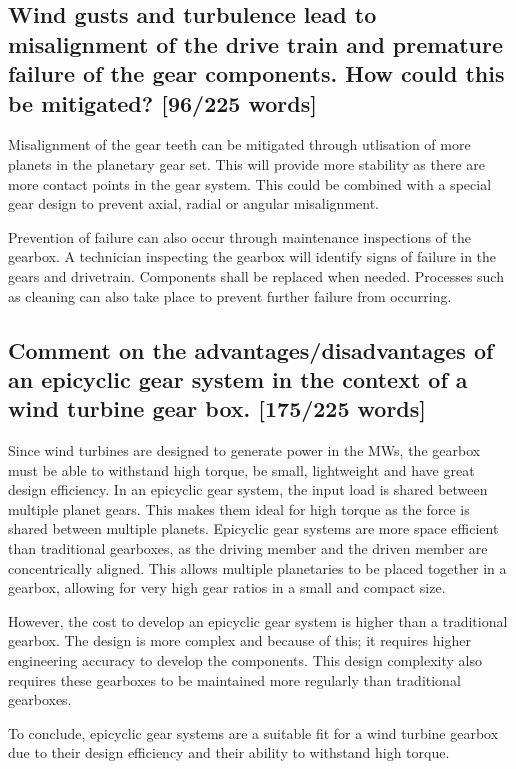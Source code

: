 \documentclass[12pt]{article}
\numberwithin{equation}{section}
\begin{document}
\begin{flushleft}
\subsection[Misalignment and failure prevention.]{Wind gusts and turbulence lead to misalignment of the drive train and premature failure of the gear components. How could this be mitigated? [96/225 words]}
Misalignment of the gear teeth can be mitigated through utlisation of more planets in the planetary gear set. This will provide more stability as there are more contact points in the gear system. This could be combined with a special gear design to prevent axial, radial or angular misalignment. 

Prevention of failure can also occur through maintenance inspections of the gearbox. A technician inspecting the gearbox will identify signs of failure in the gears and drivetrain. Components shall be replaced when needed. Processes such as cleaning can also take place to prevent further failure from occurring.

\subsection[Advantages/disadvantages of an epicyclic gearbox.]{Comment on the advantages/disadvantages of an epicyclic gear system in the context of a wind turbine gear box. [175/225 words]}
Since wind turbines are designed to generate power in the MWs, the gearbox must be able to withstand high torque, be small, lightweight and have great design efficiency. In an epicyclic gear system, the input load is shared between multiple planet gears. This makes them ideal for high torque as the force is shared between multiple planets. Epicyclic gear systems are more space efficient than traditional gearboxes, as the driving member and the driven member are concentrically aligned. This allows multiple planetaries to be placed together in a gearbox, allowing for very high gear ratios in a small and compact size.

However, the cost to develop an epicyclic gear system is higher than a traditional gearbox. The design is more complex and because of this; it requires higher engineering accuracy to develop the components. This design complexity also requires these gearboxes to be maintained more regularly than traditional gearboxes.

To conclude, epicyclic gear systems are a suitable fit for a wind turbine gearbox due to their design efficiency and their ability to withstand high torque.


\end{flushleft}
\end{document}
